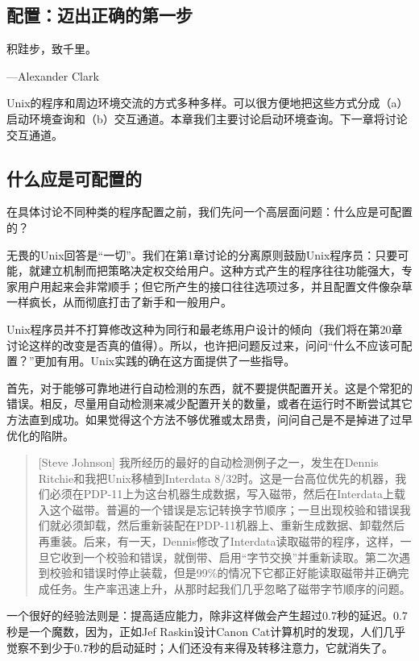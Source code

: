\documentclass[12pt,oneside]{book}
\begin{document}
\begin{common-format}
\chapter{配置：迈出正确的第一步}
\begin{flushright}
\begin{notecard}{12em}
积跬步，致千里。

{\hfill —Alexander Clark}
\end{notecard}
\end{flushright}

Unix的程序和周边环境交流的方式多种多样。可以很方便地把这些方式分成（a）启动环境查询和（b）交互通道。本章我们主要讨论启动环境查询。下一章将讨论交互通道。

\section{什么应是可配置的}
在具体讨论不同种类的程序配置之前，我们先问一个高层面问题：什么应是可配置的？

无畏的Unix回答是“一切”。我们在第1章讨论的分离原则鼓励Unix程序员：只要可能，就建立机制而把策略决定权交给用户。这种方式产生的程序往往功能强大，专家用户用起来会非常顺手；但它所产生的接口往往选项过多，并且配置文件像杂草一样疯长，从而彻底打击了新手和一般用户。

Unix程序员并不打算修改这种为同行和最老练用户设计的倾向（我们将在第20章讨论这样的改变是否真的值得）。所以，也许把问题反过来，问问“什么不应该可配置？”更加有用。Unix实践的确在这方面提供了一些指导。

首先，对于能够可靠地进行自动检测的东西，就不要提供配置开关。这是个常犯的错误。相反，尽量用自动检测来减少配置开关的数量，或者在运行时不断尝试其它方法直到成功。如果觉得这个方法不够优雅或太昂贵，问问自己是不是掉进了过早优化的陷阱。

\begin{quote}[Steve Johnson]
我所经历的最好的自动检测例子之一，发生在Dennis Ritchie和我把Unix移植到Interdata 8/32时。这是一台高位优先的机器，我们必须在PDP-11上为这台机器生成数据，写入磁带，然后在Interdata上载入这个磁带。普遍的一个错误是忘记转换字节顺序；一旦出现校验和错误我们就必须卸载，然后重新装配在PDP-11机器上、重新生成数据、卸载然后再重装。后来，有一天，Dennis修改了Interdata读取磁带的程序，这样，一旦它收到一个校验和错误，就倒带、启用“字节交换”并重新读取。第二次遇到校验和错误时停止装载，但是99\%{}的情况下它都正好能读取磁带并正确完成任务。生产率迅速上升，从那时起我们几乎忽略了磁带字节顺序的问题。
\end{quote}

一个很好的经验法则是：提高适应能力，除非这样做会产生超过0.7秒的延迟。0.7秒是一个魔数，因为，正如Jef Raskin设计Canon Cat计算机时的发现，人们几乎觉察不到少于0.7秒的启动延时；人们还没有来得及转移注意力，它就消失了。


\end{common-format}
\end{document}
